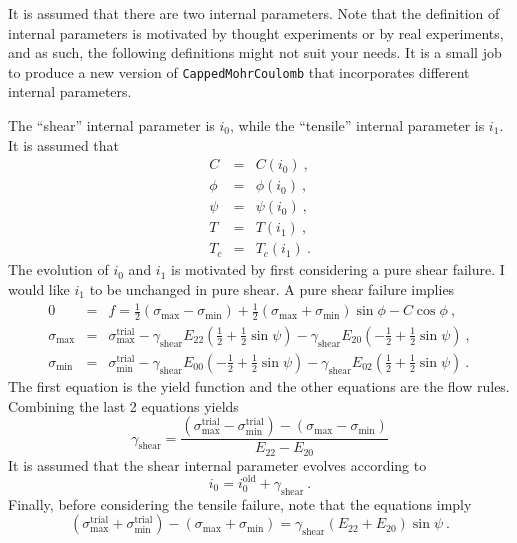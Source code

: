 \documentclass[]{scrreprt}
\newcommand{\ha}{\mbox{$\frac{1}{2}$}}
\newcommand{\ga}{\gamma}
\newcommand{\smax}{\sigma_{\mathrm{max}}}
\newcommand{\smin}{\sigma_{\mathrm{min}}}
\begin{document}
It is assumed that there are two internal parameters.  Note that the
definition of internal parameters is motivated by thought experiments
or by real experiments, and as such, the following definitions might
not suit your needs.  It is a small job to produce a new version of
{\tt CappedMohrCoulomb} that incorporates different internal parameters.

The ``shear''
internal parameter is $i_{0}$, while the ``tensile'' internal
parameter is $i_{1}$.  It is assumed that
\begin{eqnarray}
  C & = & C(i_{0}) \ , \nonumber \\
  \phi & = & \phi(i_{0}) \ , \nonumber \\
  \psi & = & \psi(i_{0}) \ , \nonumber \\
  T & = & T(i_{1}) \ , \nonumber \\
  T_{c} & = & T_{c}(i_{1}) \ .
\end{eqnarray}
The evolution of $i_{0}$ and $i_{1}$ is motivated by first considering
a pure shear failure.  I would like $i_{1}$ to be unchanged in pure shear.  A
pure shear failure implies
\begin{eqnarray}
  0 & = & f = \ha (\smax - \smin) + \ha (\smax +
  \smin)\sin\phi - C \cos\phi \ , \nonumber \\
  \smax & = & \smax^{\mathrm{trial}} -
  \gamma_{\mathrm{shear}} E_{22}(\ha + \ha\sin\psi) -
  \gamma_{\mathrm{shear}} E_{20}(-\ha + \ha\sin\psi) \ , \nonumber \\
  \smin & = & \smin^{\mathrm{trial}} -
  \gamma_{\mathrm{shear}} E_{00}(-\ha + \ha\sin\psi) -
  \gamma_{\mathrm{shear}} E_{02}(\ha + \ha\sin\psi) \ .
\end{eqnarray}
The first equation is the yield function and the other equations are
the flow rules.   Combining the last 2 equations yields
\begin{equation}
  \gamma_{\mathrm{shear}} = \frac{(\smax^{\mathrm{trial}} -
    \smin^{\mathrm{trial}}) - (\smax - \smin)}{E_{22}
    - E_{20}}
\end{equation}
It is assumed that the shear internal parameter evolves according to
\begin{equation}
  i_{0} = i_{0}^{\mathrm{old}} + \ga_{\mathrm{shear}} \ .
\end{equation}
Finally, before considering the tensile failure, note that the
equations imply
\begin{equation}
  (\smax^{\mathrm{trial}} + \smin^{\mathrm{trial}})  - (\smax + \smin) =
  \gamma_{\mathrm{shear}} \left(E_{22} + E_{20} \right)\sin\psi \ .
  \label{eqn.shear.correct}
\end{equation}
\end{document}
